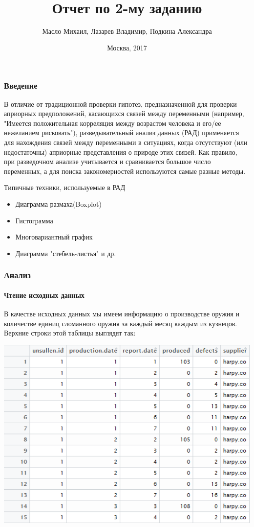 \documentclass{beamer}
\title{Отчет по 2-му заданию}
\author{Масло Михаил, Лазарев Владимир, Подкина Александра}
\institute{МГУ имени М. В. Ломоносова}
\date{Москва, 2017}
\begin{document}
\maketitle

\begin{frame}
\frametitle{Введение}
\begin{flushleft}
\small{В отличие от традиционной проверки гипотез, предназначенной для проверки априорных предположений, касающихся связей между переменными (например, "Имеется положительная корреляция между возрастом человека и его/ее нежеланием рисковать"), разведывательный анализ данных (РАД) применяется для нахождения связей между переменными в ситуациях, когда отсутствуют (или недостаточны) априорные представления о природе этих связей. Как правило, при разведочном анализе учитывается и сравнивается большое число переменных, а для поиска закономерностей используются самые разные методы.}
\end{flushleft}
\begin{center}
\begin{block}{Типичные техники, используемые в РАД}
\begin{itemize}
\item Диаграмма размаха(Boxplot)
\item Гистограмма
\item Многовариантный график
\item Диаграмма "стебель-листья" и др.
\end{itemize}
\end{block}
\end{center}
\end{frame}

\begin{frame}
\begin{flushleft}
\frametitle{Анализ}
\framesubtitle{Чтение исходных данных}
\small{В качестве исходных данных мы имеем информацию о производстве оружия и количестве единиц сломанного оружия за каждый месяц каждым из кузнецов. Верхние строки этой таблицы выглядят так:}
\end{flushleft}
\includegraphics[width=1\linewidth]{images/image1.png}
\end{frame}
\end{document}
